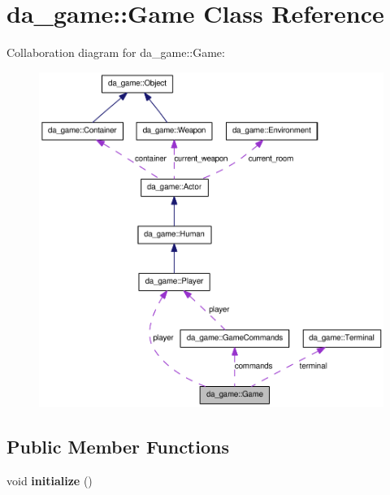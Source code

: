 \hypertarget{classda__game_1_1Game}{
\section{da\_\-game::Game Class Reference}
\label{classda__game_1_1Game}
}
Collaboration diagram for da\_\-game::Game:\nopagebreak
\begin{figure}[H]
\begin{center}
\leavevmode
\includegraphics[width=400pt]{classda__game_1_1Game__coll__graph}
\end{center}
\end{figure}
\subsection*{Public Member Functions}
\begin{DoxyCompactItemize}
\item 
\hypertarget{classda__game_1_1Game_aa88f274b8ac3f044da844a0ebc0d9070}{
void {\bfseries initialize} ()}
\label{classda__game_1_1Game_aa88f274b8ac3f044da844a0ebc0d9070}

\end{DoxyCompactItemize}
